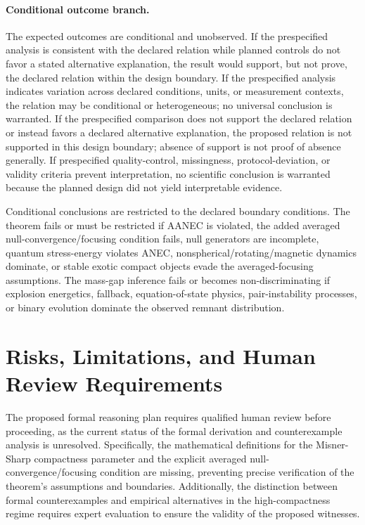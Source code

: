 \documentclass[conference]{IEEEtran}
\begin{document}
\paragraph{Conditional outcome branch.} The expected outcomes are conditional and unobserved. If the prespecified analysis is consistent with the declared relation while planned controls do not favor a stated alternative explanation, the result would support, but not prove, the declared relation within the design boundary. If the prespecified analysis indicates variation across declared conditions, units, or measurement contexts, the relation may be conditional or heterogeneous; no universal conclusion is warranted. If the prespecified comparison does not support the declared relation or instead favors a declared alternative explanation, the proposed relation is not supported in this design boundary; absence of support is not proof of absence generally. If prespecified quality-control, missingness, protocol-deviation, or validity criteria prevent interpretation, no scientific conclusion is warranted because the planned design did not yield interpretable evidence.

Conditional conclusions are restricted to the declared boundary conditions. The theorem fails or must be restricted if AANEC is violated, the added averaged null-convergence/focusing condition fails, null generators are incomplete, quantum stress-energy violates ANEC, nonspherical/rotating/magnetic dynamics dominate, or stable exotic compact objects evade the averaged-focusing assumptions. The mass-gap inference fails or becomes non-discriminating if explosion energetics, fallback, equation-of-state physics, pair-instability processes, or binary evolution dominate the observed remnant distribution.

\section{Risks, Limitations, and Human Review Requirements}
The proposed formal reasoning plan requires qualified human review before proceeding, as the current status of the formal derivation and counterexample analysis is unresolved. Specifically, the mathematical definitions for the Misner-Sharp compactness parameter and the explicit averaged null-convergence/focusing condition are missing, preventing precise verification of the theorem's assumptions and boundaries. Additionally, the distinction between formal counterexamples and empirical alternatives in the high-compactness regime requires expert evaluation to ensure the validity of the proposed witnesses.
\end{document}
